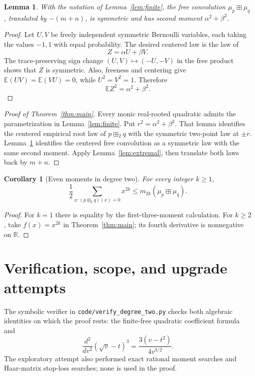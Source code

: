\documentclass[11pt]{article}
\newtheorem{lemma}[theorem]{Lemma}
\newtheorem{corollary}[theorem]{Corollary}
\theoremstyle{remark}
\newcommand{\R}{\mathbb{R}}
\newcommand{\E}{\mathbb{E}}
\newcommand{\ffbox}{\mathbin{\boxplus_{2}}}
\newcommand{\freebox}{\mathbin{\boxplus}}
\begin{document}
\begin{lemma}\label{lem:free}
With the notation of Lemma~\ref{lem:finite}, the free convolution
$\mu_p\freebox\mu_q$, translated by $-(m+n)$, is symmetric and has second
moment $\alpha^2+\beta^2$.
\end{lemma}

\begin{proof}
Let $U,V$ be freely independent symmetric Bernoulli variables, each taking
the values $-1,1$ with equal probability.  The desired centered law is the
law of
\[
 Z=\alpha U+\beta V.
\]
The trace-preserving sign change $(U,V)\mapsto(-U,-V)$ in the free product
shows that $Z$ is symmetric.  Also, freeness and centering give
$\E(UV)=\E(VU)=0$, while $U^2=V^2=1$.  Therefore
\[
 \E Z^2=\alpha^2+\beta^2.
\]
\end{proof}

\begin{proof}[Proof of Theorem~\ref{thm:main}]
Every monic real-rooted quadratic admits the parametrization in
Lemma~\ref{lem:finite}.  Put $r^2=\alpha^2+\beta^2$.  That lemma identifies
the centered empirical root law of $p\ffbox q$ with the symmetric two-point
law at $\pm r$.  Lemma~\ref{lem:free} identifies the centered free
convolution as a symmetric law with the same second moment.  Apply
Lemma~\ref{lem:extremal}, then translate both laws back by $m+n$.
\end{proof}

\begin{corollary}[Even moments in degree two]
For every integer $k\geq1$,
\[
 \frac12\sum_{x:(p\ffbox q)(x)=0}x^{2k}
 \leq m_{2k}(\mu_p\freebox\mu_q).
\]
\end{corollary}

\begin{proof}
For $k=1$ there is equality by the first-three-moment calculation.  For
$k\geq2$, take $f(x)=x^{2k}$ in Theorem~\ref{thm:main}; its fourth
derivative is nonnegative on $\R$.
\end{proof}

\section{Verification, scope, and upgrade attempts}

The symbolic verifier in \texttt{code/verify\_degree\_two.py} checks both
algebraic identities on which the proof rests: the finite-free quadratic
coefficient formula and
\[
 \frac{d^2}{dv^2}(\sqrt v-t)^3
 =\frac{3(v-t^2)}{4v^{3/2}}.
\]
The exploratory attempt also performed exact rational moment searches and
Haar-matrix stop-loss searches; none is used in the proof.
\end{document}

